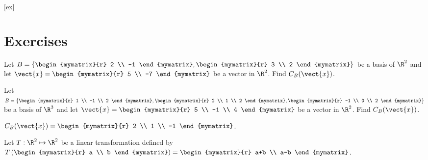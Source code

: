 [ex]
\section*{Exercises}

\begin{enumialphparenastyle}

\begin{ex}
Let $B = \left\{ \begin{mymatrix}{r}
2 \\
-1 
\end{mymatrix}, \begin{mymatrix}{r}
3 \\
2
\end{mymatrix} \right\}$ be a basis of $\R^2$ and let $\vect{x} = \begin{mymatrix}{r}
5 \\
-7
\end{mymatrix}$ be a vector in $\R^2$. Find $C_B(\vect{x})$. 
\end{ex}

\begin{ex}
Let $B = \left\{ \begin{mymatrix}{r}
1 \\
-1 \\
2 
\end{mymatrix}, \begin{mymatrix}{r}
2 \\
1 \\
2
 \end{mymatrix}, \begin{mymatrix}{r}
-1 \\
0 \\
2
\end{mymatrix} \right\}$ 
be a basis of $\R^3$ and let $\vect{x} = \begin{mymatrix}{r}
5 \\
-1 \\
4
\end{mymatrix}$ be a vector in $\R^2$. Find $C_B(\vect{x})$. 
\begin{sol}
 $C_B(\vect{x}) = 
\begin{mymatrix}{r}
2 \\
1 \\
-1
 \end{mymatrix} $.
\end{sol}
\end{ex}


\begin{ex}
Let $T: \R^2 \mapsto \R^2$ be a linear transformation defined by $T \left( \begin{mymatrix}{r}
a \\
b
\end{mymatrix} \right) = \begin{mymatrix}{r}
a+b \\
a-b
\end{mymatrix}$. 


\end{ex}
\end{enumialphparenastyle}
